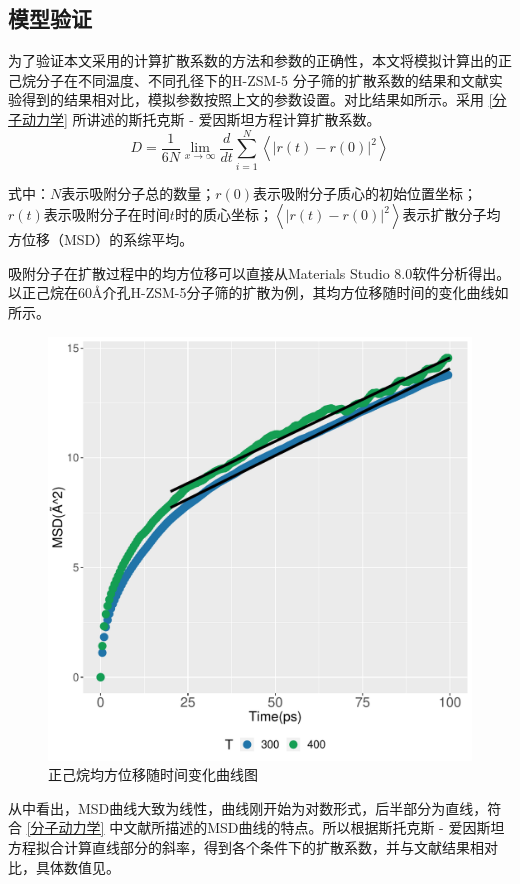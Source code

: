 \subsection{模型验证}
\par{为了验证本文采用的计算扩散系数的方法和参数的正确性，本文将模拟计算出的正己烷分子在不同温度、不同孔径下的H-ZSM-5 分子筛的扩散系数的结果和文献\cite{bu2018diffusion}实验得到的结果相对比，模拟参数按照上文的参数设置。对比结果如所示。采用 \ref{分子动力学} 所讲述的斯托克斯 - 爱因斯坦方程计算扩散系数。}
\begin{equation}
    D=\frac{1}{6 N} \lim _{x \rightarrow \infty} \frac{d}{d t} \sum_{i=1}^{N}\left\langle|r(t)-r(0)|^{2}\right\rangle
\end{equation}
\par{式中：$N$表示吸附分子总的数量；$r(0)$表示吸附分子质心的初始位置坐标；$r(t)$表示吸附分子在时间$t$时的质心坐标；$\left\langle|r(t)-r(0)|^{2}\right\rangle$表示扩散分子均方位移（MSD）的系综平均。}
\par{吸附分子在扩散过程中的均方位移可以直接从Materials Studio 8.0软件分析得出。以正己烷在60Å介孔H-ZSM-5分子筛的扩散为例，其均方位移随时间的变化曲线如所示。}
\begin{figure}[H]
    \centering
        \includegraphics[width=0.5\linewidth]{figure/Diffusion/C6.pdf}
    \caption{正己烷均方位移随时间变化曲线图}
    \label{fig:C6}
\end{figure}
\par{从中看出，MSD曲线大致为线性，曲线刚开始为对数形式，后半部分为直线，符合 \ref{分子动力学} 中文献所描述的MSD曲线的特点。所以根据斯托克斯 - 爱因斯坦方程拟合计算直线部分的斜率，得到各个条件下的扩散系数，并与文献结果相对比，具体数值见。}
